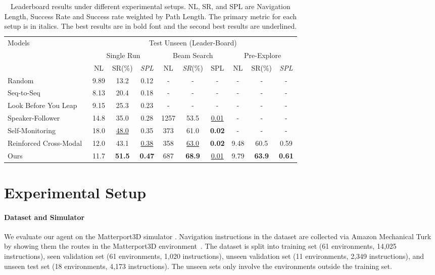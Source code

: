 \documentclass[11pt,a4paper]{article}
\begin{document}
\begin{table*}[t]
\small
\begin{center}
 \begin{tabular}{|l | c c c | c c c | c c c |}
  \hline
  Models  &  \multicolumn{9}{c|}{Test Unseen (Leader-Board)} \\
    & \multicolumn{3}{c|}{Single Run} & \multicolumn{3}{c|}{Beam Search} & \multicolumn{3}{c|}{Pre-Explore} \\

  \hline 
&  NL & SR(\%) & \emph{SPL} & NL & \emph{SR}(\%) & SPL &  NL & SR(\%) & \emph{SPL}   \\
\hline
Random~\cite{mattersim} & 	9.89 &	13.2 &	0.12 &	- &	- & - & - & - & - \\
Seq-to-Seq~\cite{mattersim} & 8.13 & 	20.4 &	0.18 &	- &	- & - & - & - & -\\
\hline
Look Before You Leap~\cite{wang2018look} &	9.15 &	25.3&	0.23&-  &-  &-  &-  &-  &- \\
Speaker-Follower~\cite{fried2018speaker} & 	14.8 &	35.0 &	0.28 & 1257 & 53.5  &\underline{0.01}  &-  &-  &- \\
Self-Monitoring~\cite{anonymous2019self-aware} & 18.0  &	\underline{48.0} &	0.35 &	373&    61.0 & \textbf{0.02}  &-  &- &-  \\
Reinforced Cross-Modal~\cite{wang2018reinforced} & 12.0 &43.1	&	\underline{0.38}&	358 & \underline{63.0} & \textbf{0.02}   &9.48&	60.5  &0.59  \\
\hline
Ours & 11.7  & \textbf{51.5}  & \textbf{0.47}  & 687 & \textbf{68.9}  & \underline{0.01} & 9.79 & \textbf{63.9}& \textbf{0.61}    \\
  \hline
\end{tabular}
\end{center}
\caption{
Leaderboard results under different experimental setups.
NL, SR, and SPL are Navigation Length, Success Rate and Success rate weighted by Path Length.
The primary metric for each setup is in italics. 
The best results are in bold font and the second best results are underlined.
}
\vspace{-9pt}
\label{table:result}
\end{table*}
\section{Experimental Setup}

\paragraph{Dataset and Simulator}
\label{sec:data}
We evaluate our agent on the Matterport3D simulator \cite{mattersim}. 
Navigation instructions in the dataset are collected via Amazon Mechanical Turk by showing them the routes in the Matterport3D environment~\cite{Matterport3D}. 
The dataset is split into training set (61 environments, 14,025 instructions), seen validation set (61 environments, 1,020 instructions), unseen validation set (11 environments, 2,349 instructions), and unseen test set (18 environments, 4,173 instructions). 
The unseen sets only involve the environments outside the training set. 
\end{document}
